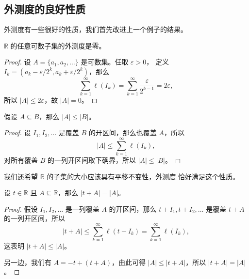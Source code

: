 \documentclass[fontset=none]{Notes}
\begin{document}
\subsection{外测度的良好性质}

外测度有一些很好的性质，我们首先改进上一个例子的结果。

\begin{proposition}[可数集的外测度为零]
  $\mathbb{R}$ 的任意可数子集的外测度是零。
\end{proposition}
\begin{proof}
  设 $A=\{a_1,a_2,\dots\}$ 是可数集。任取 $\varepsilon>0$，
  定义 $I_k=(a_k-\varepsilon/2^k,a_k+\varepsilon/2^k)$，那么
  \[
    \sum_{k=1}^\infty \ell(I_k)=\sum_{k=1}^\infty\frac{\varepsilon}{2^{k-1}}
    =2\varepsilon,
  \]
  所以 $|A|\leq 2\varepsilon$，故 $|A|=0$。
\end{proof}

\begin{proposition}[外测度保序]
  假设 $A\subseteq B$，那么 $|A|\leq|B|$。
\end{proposition}
\begin{proof}
  设 $I_1,I_2,\dots$ 是覆盖 $B$ 的开区间，那么也覆盖 $A$，所以
  \[
    |A|\leq\sum_{k=1}^\infty\ell(I_k),
  \]
  对所有覆盖 $B$ 的一列开区间取下确界，所以 $|A|\leq|B|$。
\end{proof}

我们还希望 $\mathbb{R}$ 的子集的大小应该具有平移不变性，外测度
恰好满足这个性质。

\begin{proposition}[外测度具有平移不变性]
  设 $t\in \mathbb{R}$ 且 $A\subseteq \mathbb{R}$，那么 
  $|t+A|=|A|$。
\end{proposition}
\begin{proof}
  假设 $I_1,I_2,\dots$ 是一列覆盖 $A$ 的开区间，那么 $t+I_1,t+I_2,\dots$
  是覆盖 $t+A$ 的一列开区间，所以
  \[
    |t+A|\leq \sum_{k=1}^\infty\ell(t+I_k)=\sum_{k=1}^\infty \ell(I_k),
  \]
  这表明 $|t+A|\leq |A|$。

  另一边，我们有 $A=-t+(t+A)$，由此可得 $|A|\leq |t+A|$，所以
  $|t+A|=|A|$。
\end{proof}
\end{document}
